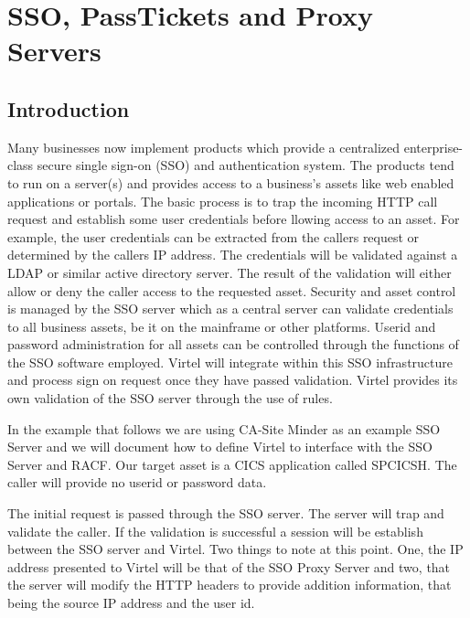 \documentclass[letterpaper,10pt,english]{sphinxmanual}
\begin{document}
\chapter{SSO, PassTickets and Proxy Servers}
\label{\detokenize{connectivity_guide:sso-passtickets-and-proxy-servers}}

\section{Introduction}
\label{\detokenize{connectivity_guide:id74}}
Many businesses now implement products which provide a centralized enterprise-class secure single sign-on (SSO) and authentication system. The products tend to run on a server(s) and provides access to a business’s assets like web enabled applications or portals. The basic process is to trap the incoming HTTP call request and establish some user credentials before llowing access to an asset. For example, the user credentials can be extracted from the callers request or determined by the callers IP address. The credentials will be validated against a LDAP or similar active directory server. The result of the validation will either allow or deny the caller access to the requested asset. Security and asset control is managed by the SSO server which as a central server can validate credentials to all business assets, be it on the mainframe or other platforms. Userid and password administration for all assets can be controlled through the functions of the SSO software employed. Virtel will integrate within this SSO infrastructure and process sign on request once they have passed validation. Virtel provides its own validation of the SSO server through the use of rules.

In the example that follows we are using CA-Site Minder as an example SSO Server and we will document how to define Virtel to interface with the SSO Server and RACF. Our target asset is a CICS application called SPCICSH. The caller will provide no userid or password data.

 

The initial request is passed through the SSO server. The server will trap and validate the caller. If the validation is successful a session will be establish between the SSO server and Virtel. Two things to note at this point. One, the IP address presented to Virtel will be that of the SSO Proxy Server and two, that the server will modify the HTTP headers to provide addition information, that being the source IP address and the user id.
\end{document}
